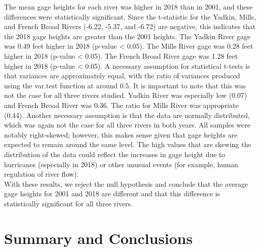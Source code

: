 \documentclass[12pt,]{article}
\begin{document}
The mean gage heights for each river was higher in 2018 than in 2001,
and these differences were statistically significant. Since the
t-statistic for the Yadkin, Mills, and French Broad Rivers (-6.22,
-5.37, and -6.72) are negative, this indicates that the 2018 gage
heights are greater than the 2001 heights. The Yadkin River gage was
0.49 feet higher in 2018 (p-value \textless{} 0.05). The Mills River
gage was 0.28 feet higher in 2018 (p-value \textless{} 0.05). The French
Broad River gage was 1.28 feet higher in 2018 (p-value \textless{}
0.05). A necessary assumption for statistical t-tests is that variances
are approximately equal, with the ratio of variances produced using the
var.test function at around 0.5. It is important to note that this was
not the case for all three rivers studied. Yadkin River was especially
low (0.07) and French Broad River was 0.36. The ratio for Mills River
was appropriate (0.44). Another necessary assumption is that the data
are normally distributed, which was again not the case for all three
rivers in both years. All samples were notably right-skewed; however,
this makes sense given that gage heights are expected to remain around
the same level. The high values that are skewing the distribution of the
data could reflect the increases in gage height due to hurricanes
(especially in 2018) or other unusual events (for example, human
regulation of river flow).\\
With these results, we reject the null hypothesis and conclude that the
average gage heights for 2001 and 2018 are different and that this
difference is statistically significant for all three rivers.

\newpage

\hypertarget{summary-and-conclusions}{%
\section{Summary and Conclusions}\label{summary-and-conclusions}}
\end{document}
